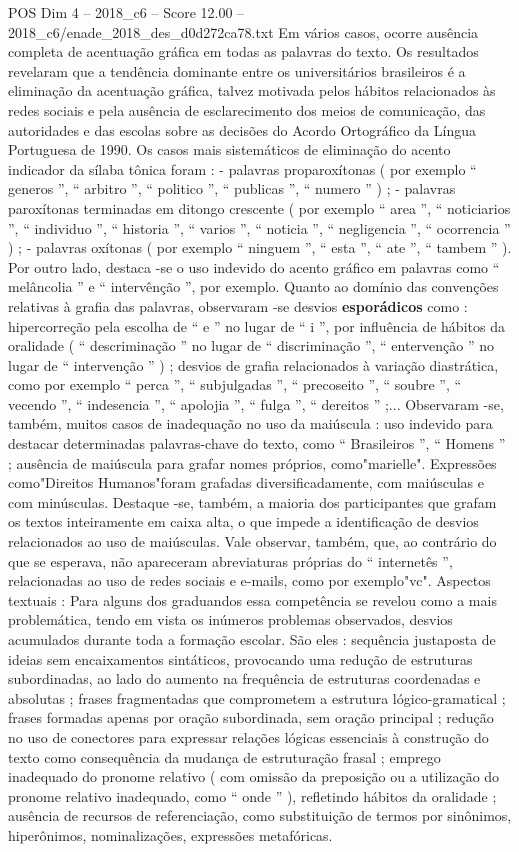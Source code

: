 \begin{textsample}{POS Dim 4 – 2018\_c6 – Score 12.00 – 2018\_c6/enade\_2018\_des\_d0d272ca78.txt}
Em vários casos, ocorre ausência completa de acentuação gráfica em todas as palavras do texto.
Os resultados revelaram que a tendência dominante entre os universitários brasileiros é a eliminação da acentuação gráfica, talvez motivada pelos hábitos relacionados às redes sociais e pela ausência de esclarecimento dos meios de comunicação, das autoridades e das escolas sobre as decisões do Acordo Ortográfico da Língua Portuguesa de 1990.
Os casos mais sistemáticos de eliminação do acento indicador da sílaba tônica foram : - palavras proparoxítonas ( por exemplo “ generos ”, “ arbitro ”, “ politico ”, “ publicas ”, “ numero ” ) ; - palavras paroxítonas terminadas em ditongo crescente ( por exemplo “ area ”, “ noticiarios ”, “ individuo ”, “ historia ”, “ varios ”, “ noticia ”, “ negligencia ”, “ ocorrencia ” ) ; - palavras oxítonas ( por exemplo “ ninguem ”, “ esta ”, “ ate ”, “ tambem ” ).
Por outro lado, destaca -se o uso indevido do acento gráfico em palavras como “ melâncolia ” e “ intervênção ”, por exemplo.
Quanto ao domínio das convenções relativas à grafia das palavras, observaram -se desvios \textbf{esporádicos} como : hipercorreção pela escolha de “ e ” no lugar de “ i ”, por influência de hábitos da oralidade ( “ descriminação ” no lugar de “ discriminação ”, “ entervenção ” no lugar de “ intervenção ” ) ; desvios de grafia relacionados à variação diastrática, como por exemplo “ perca ”, “ subjulgadas ”, “ precoseito ”, “ soubre ”, “ vecendo ”, “ indesencia ”, “ apolojia ”, “ fulga ”, “ dereitos ” ;...
Observaram -se, também, muitos casos de inadequação no uso da maiúscula : uso indevido para destacar determinadas palavras-chave do texto, como “ Brasileiros ”, “ Homens ” ; ausência de maiúscula para grafar nomes próprios, como"marielle".
Expressões como"Direitos Humanos"foram grafadas diversificadamente, com maiúsculas e com minúsculas.
Destaque -se, também, a maioria dos participantes que grafam os textos inteiramente em caixa alta, o que impede a identificação de desvios relacionados ao uso de maiúsculas.
Vale observar, também, que, ao contrário do que se esperava, não apareceram abreviaturas próprias do “ internetês ”, relacionadas ao uso de redes sociais e e-mails, como por exemplo"vc".
Aspectos textuais : Para alguns dos graduandos essa competência se revelou como a mais problemática, tendo em vista os inúmeros problemas observados, desvios acumulados durante toda a formação escolar.
São eles : sequência justaposta de ideias sem encaixamentos sintáticos, provocando uma redução de estruturas subordinadas, ao lado do aumento na frequência de estruturas coordenadas e absolutas ; frases fragmentadas que comprometem a estrutura lógico-gramatical ; frases formadas apenas por oração subordinada, sem oração principal ; redução no uso de conectores para expressar relações lógicas essenciais à construção do texto como consequência da mudança de estruturação frasal ; emprego inadequado do pronome relativo ( com omissão da preposição ou a utilização do pronome relativo inadequado, como “ onde ” ), refletindo hábitos da oralidade ; ausência de recursos de referenciação, como substituição de termos por sinônimos, hiperônimos, nominalizações, expressões metafóricas.

\end{textsample}

